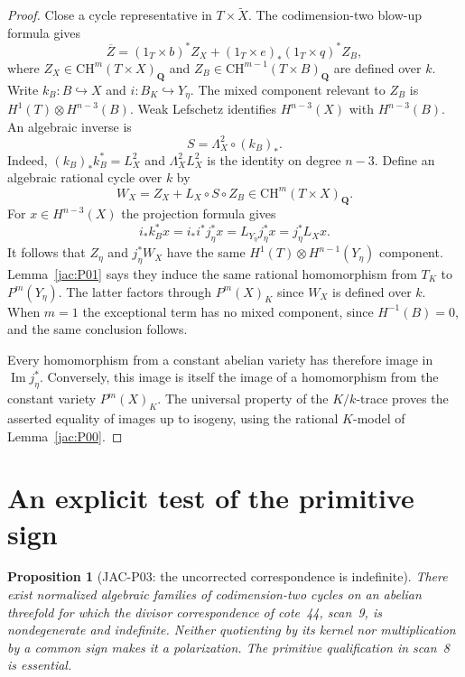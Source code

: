 \documentclass[11pt,a4paper]{article}
\newtheorem{proposition}[theorem]{Proposition}
\begin{document}
\begin{proof}
Close a cycle representative in $T\times\widetilde X$.
The codimension-two blow-up formula gives
\[
 \overline Z=(1_T\times b)^*Z_X+
 (1_T\times e)_*(1_T\times q)^*Z_B,
\]
where
$Z_X\in\mathrm{CH}^m(T\times X)_{\mathbf Q}$ and
$Z_B\in\mathrm{CH}^{m-1}(T\times B)_{\mathbf Q}$ are defined over
$k$.  Write $k_B:B\hookrightarrow X$ and $i:B_K\hookrightarrow Y_\eta$.
The mixed component relevant to $Z_B$ is
$H^1(T)\otimes H^{n-3}(B)$.
Weak Lefschetz identifies $H^{n-3}(X)$ with $H^{n-3}(B)$.
An algebraic inverse is
\[
 S=\Lambda_X^2\circ(k_B)_*.
\]
Indeed, $(k_B)_*k_B^*=L_X^2$ and $\Lambda_X^2L_X^2$ is the
identity on degree $n-3$.  Define an algebraic rational cycle over $k$
by
\[
 W_X=Z_X+L_X\circ S\circ Z_B\in
 \mathrm{CH}^m(T\times X)_{\mathbf Q}.
\]
For $x\in H^{n-3}(X)$ the projection formula gives
\[
 i_*k_B^*x=i_*i^*j_\eta^*x=L_{Y_\eta}j_\eta^*x
 =j_\eta^*L_Xx.
\]
It follows that $Z_\eta$ and $j_\eta^*W_X$ have the same
$H^1(T)\otimes H^{n-1}(Y_\eta)$ component.  Lemma~\ref{jac:P01}
says they induce the same rational homomorphism from $T_K$ to
$P^m(Y_\eta)$.  The latter factors through $P^m(X)_K$ since $W_X$
is defined over $k$.  When $m=1$ the exceptional term has no mixed
component, since $H^{-1}(B)=0$, and the same conclusion follows.

Every homomorphism from a constant abelian variety has therefore image
in $\operatorname{Im}j_\eta^*$.  Conversely, this image is itself the
image of a homomorphism from the constant variety $P^m(X)_K$.
The universal property of the $K/k$-trace proves the asserted equality
of images up to isogeny, using the rational $K$-model of
Lemma~\ref{jac:P00}.
\end{proof}

\section{An explicit test of the primitive sign}

\begin{proposition}[JAC-P03: the uncorrected correspondence is indefinite]
\label{jac:P03}
There exist normalized algebraic families of codimension-two cycles
on an abelian threefold for which the divisor correspondence of
cote~44, scan~9, is nondegenerate and indefinite.  Neither quotienting
by its kernel nor multiplication by a common sign makes it a
polarization.  The primitive qualification in scan~8 is essential.
\end{proposition}
\end{document}
